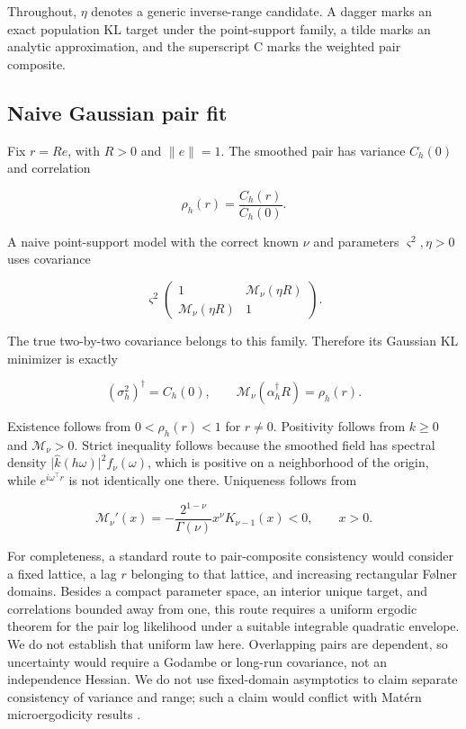 \documentclass[11pt]{article}
\theoremstyle{remark}
\newcommand{\Matern}{\mathcal M}
\begin{document}
Throughout, \(\eta\) denotes a generic inverse-range candidate. A dagger marks
an exact population KL target under the point-support family, a tilde marks an
analytic approximation, and the superscript \(\mathrm C\) marks the weighted
pair composite.

\subsection{Naive Gaussian pair fit}

Fix \(r=Re\), with \(R>0\) and \(\lVert e\rVert=1\).  The smoothed pair has
variance \(C_h(0)\) and correlation

\begin{equation}
  \rho_h(r)=\frac{C_h(r)}{C_h(0)}.
\end{equation}

A naive point-support model with the correct known \(\nu\) and parameters
\(\varsigma^2,\eta>0\) uses covariance

\begin{equation}
  \varsigma^2
  \begin{pmatrix}
    1 & \Matern_\nu(\eta R)\\
    \Matern_\nu(\eta R) & 1
  \end{pmatrix}.
  \label{eq:naive-pair}
\end{equation}

The true two-by-two covariance belongs to this family.  Therefore its Gaussian
KL minimizer is exactly

\begin{equation}
  (\sigma_h^2)^\dagger=C_h(0),
  \qquad
  \Matern_\nu(\alpha_h^\dagger R)=\rho_h(r).
  \label{eq:exact-pseudo-target}
\end{equation}

Existence follows from \(0<\rho_h(r)<1\) for \(r\ne0\).  Positivity follows
from \(k\geq0\) and \(\Matern_\nu>0\).  Strict inequality follows because the
smoothed field has spectral density
\(\lvert\widehat k(h\omega)\rvert^2 f_\nu(\omega)\), which is positive on a
neighborhood of the origin, while \(e^{i\omega^\top r}\) is not identically one
there.  Uniqueness follows from

\begin{equation}
  \Matern_\nu'(x)
  =-\frac{2^{1-\nu}}{\Gamma(\nu)}x^\nu K_{\nu-1}(x)<0,
  \qquad x>0.
  \label{eq:matern-derivative}
\end{equation}

For completeness, a standard route to pair-composite consistency would consider
a fixed lattice, a lag \(r\) belonging to that lattice, and increasing
rectangular F{\o}lner domains. Besides a compact parameter space, an interior
unique target, and correlations bounded away from one, this route requires a
uniform ergodic theorem for the pair log likelihood under a suitable integrable
quadratic envelope. We do not establish that uniform law here. Overlapping
pairs are dependent, so uncertainty would require a Godambe or long-run
covariance, not an independence Hessian. We do not use fixed-domain asymptotics
to claim separate consistency of variance and range; such a claim would conflict
with Mat\'ern microergodicity results
\citep{zhang2004inconsistent,stein1999interpolation}.
\end{document}
